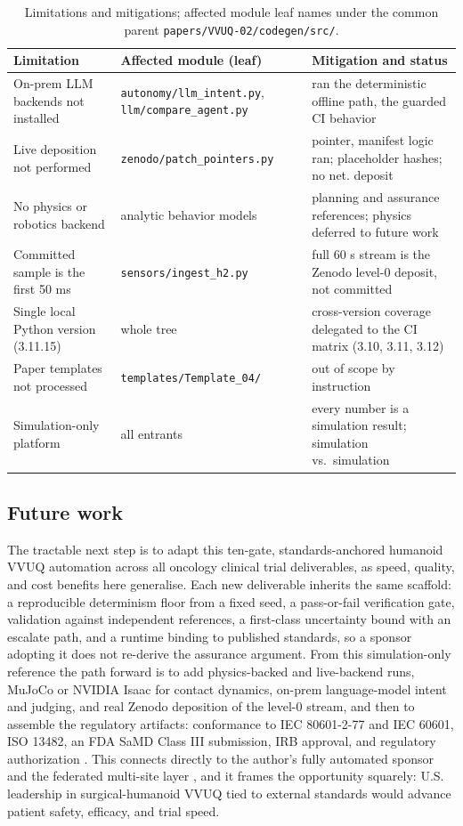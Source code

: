 \begin{table}[H]
\caption{Limitations and mitigations; affected module leaf names under the common
parent \texttt{papers/VVUQ-02/codegen/src/}.}
\label{tab:limitations}
\centering
\footnotesize
\begin{tabularx}{\textwidth}{Y L{4.1cm} Y}
\toprule
\textbf{Limitation} & \textbf{Affected module (leaf)} & \textbf{Mitigation and status} \\
\midrule
On-prem LLM backends not installed & \texttt{autonomy/llm\_intent.py}, \texttt{llm/compare\_agent.py} & ran the deterministic offline path, the guarded CI behavior \\
Live deposition not performed & \texttt{zenodo/patch\_pointers.py} & pointer, manifest logic ran; placeholder hashes; no net. deposit \\
No physics or robotics backend & analytic behavior models & planning and assurance references; physics deferred to future work \\
Committed sample is the first 50 ms & \texttt{sensors/ingest\_h2.py} & full 60 s stream is the Zenodo level-0 deposit, not committed \\
Single local Python version (3.11.15) & whole tree & cross-version coverage delegated to the CI matrix (3.10, 3.11, 3.12) \\
Paper templates not processed & \texttt{templates/Template\_04/} & out of scope by instruction \\
Simulation-only platform & all entrants & every number is a simulation result; simulation vs.\ simulation \\
\bottomrule
\end{tabularx}
\end{table}

\subsection{Future work}

The tractable next step is to adapt this ten-gate, standards-anchored humanoid
VVUQ automation across all oncology clinical trial deliverables, as speed, quality, and cost benefits here generalise. Each new deliverable
inherits the same scaffold: a reproducible determinism floor from a fixed seed, a
pass-or-fail verification gate, validation against independent references, a
first-class uncertainty bound with an escalate path, and a runtime binding to
published standards, so a sponsor adopting it does not re-derive the assurance
argument. From this simulation-only reference the path forward
is to add physics-backed and live-backend runs, MuJoCo or NVIDIA Isaac for
contact dynamics, on-prem language-model intent and judging, and real Zenodo
deposition of the level-0 stream, and then to assemble the regulatory artifacts: conformance to IEC 80601-2-77 and IEC 60601,
ISO 13482, an FDA SaMD Class III
submission, IRB
approval, and regulatory authorization \cite{iec8060127, iec60601, iso13482,
fda2023credibility}. This connects directly to the author's fully automated sponsor and the federated multi-site
layer \cite{kawchak2026sponsor, kawchak2026federated}, and it frames the
opportunity squarely: U.S. leadership in surgical-humanoid VVUQ tied to
external standards would advance patient safety, efficacy, and trial speed.
